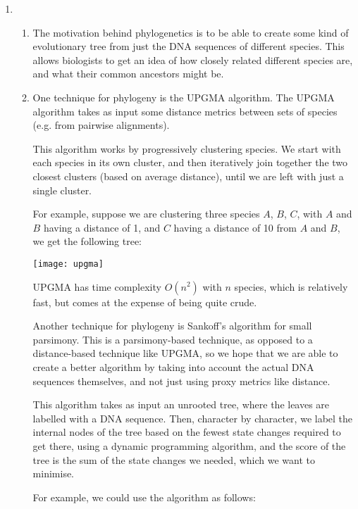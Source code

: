 


\begin{enumerate}[label=(\alph*)]
  \item
    \begin{enumerate}[label=(\roman*)]
      \item
        The motivation behind phylogenetics is to be able to create some kind of evolutionary tree from just the DNA sequences of different species. This allows biologists to get an idea of how closely related different species are, and what their common ancestors might be.

      \item
        One technique for phylogeny is the UPGMA algorithm. The UPGMA algorithm takes as input some distance metrics between sets of species (e.g. from pairwise alignments).

        This algorithm works by progressively clustering species. We start with each species in its own cluster, and then iteratively join together the two closest clusters (based on average distance), until we are left with just a single cluster.

        For example, suppose we are clustering three species $A$, $B$, $C$, with $A$ and $B$ having a distance of 1, and $C$ having a distance of 10 from $A$ and $B$, we get the following tree:

        \texttt{[image: upgma]}

        UPGMA has time complexity $O(n^2)$ with $n$ species, which is relatively fast, but comes at the expense of being quite crude.


        \vspace{20pt}

        Another technique for phylogeny is Sankoff's algorithm for small parsimony. This is a parsimony-based technique, as opposed to a distance-based technique like UPGMA, so we hope that we are able to create a better algorithm by taking into account the actual DNA sequences themselves, and not just using proxy metrics like distance.

        This algorithm takes as input an unrooted tree, where the leaves are labelled with a DNA sequence. Then, character by character, we label the internal nodes of the tree based on the fewest state changes required to get there, using a dynamic programming algorithm, and the score of the tree is the sum of the state changes we needed, which we want to minimise.

        For example, we could use the algorithm as follows:


\end{enumerate}
\end{enumerate}
